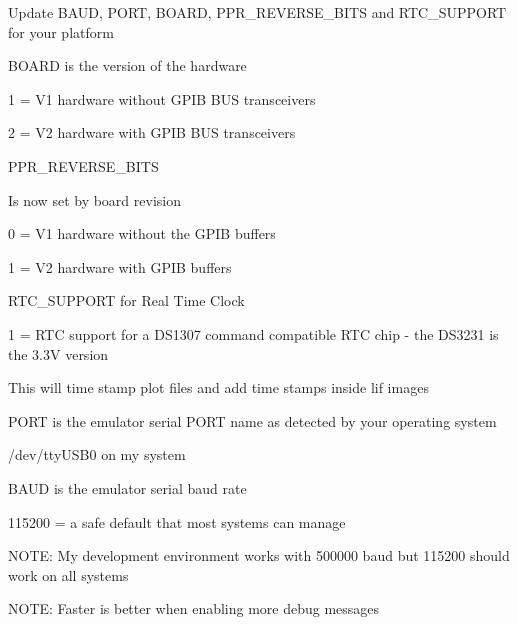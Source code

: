 \begin{DoxyItemize}
\item Update B\+A\+UD, P\+O\+RT, B\+O\+A\+RD, P\+P\+R\+\_\+\+R\+E\+V\+E\+R\+S\+E\+\_\+\+B\+I\+TS and R\+T\+C\+\_\+\+S\+U\+P\+P\+O\+RT for your platform
\begin{DoxyItemize}
\item B\+O\+A\+RD is the version of the hardware
\begin{DoxyItemize}
\item 1 = V1 hardware without G\+P\+IB B\+US transceivers
\item 2 = V2 hardware with G\+P\+IB B\+US transceivers
\end{DoxyItemize}
\item P\+P\+R\+\_\+\+R\+E\+V\+E\+R\+S\+E\+\_\+\+B\+I\+TS
\begin{DoxyItemize}
\item Is now set by board revision
\item 0 = V1 hardware without the G\+P\+IB buffers
\item 1 = V2 hardware with G\+P\+IB buffers
\end{DoxyItemize}
\item R\+T\+C\+\_\+\+S\+U\+P\+P\+O\+RT for Real Time Clock
\begin{DoxyItemize}
\item 1 = R\+TC support for a D\+S1307 command compatible R\+TC chip -\/ the D\+S3231 is the 3.\+3V version
\begin{DoxyItemize}
\item This will time stamp plot files and add time stamps inside lif images
\end{DoxyItemize}
\end{DoxyItemize}
\item P\+O\+RT is the emulator serial P\+O\+RT name as detected by your operating system
\begin{DoxyItemize}
\item /dev/tty\+U\+S\+B0 on my system
\end{DoxyItemize}
\item B\+A\+UD is the emulator serial baud rate
\begin{DoxyItemize}
\item 115200 = a safe default that most systems can manage
\begin{DoxyItemize}
\item N\+O\+TE\+: My development environment works with 500000 baud but 115200 should work on all systems
\item N\+O\+TE\+: Faster is better when enabling more debug messages

\end{DoxyItemize}
\end{DoxyItemize}
\end{DoxyItemize}
\end{DoxyItemize}
